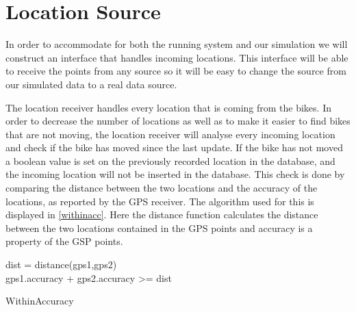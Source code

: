 \section{Location Source}\label{design:datareceiver}
In order to accommodate for both the running system and our simulation we will construct an interface that handles incoming locations.
This interface will be able to receive the points from any source so it will be easy to change the source from our simulated data to a real data source.

The location receiver handles every location that is coming from the bikes.
In order to decrease the number of locations as well as to make it easier to find bikes that are not moving, the location receiver will analyse every incoming location and check if the bike has moved since the last update.
If the bike has not moved a boolean value is set on the previously recorded location in the database, and the incoming location will not be inserted in the database.
This check is done by comparing the distance between the two locations and the accuracy of the locations, as reported by the GPS receiver.
The algorithm used for this is displayed in \cref{withinacc}.
Here the distance function calculates the distance between the two locations contained in the GPS points and accuracy is a property of the GSP points.

\begin{algorithm}

dist = distance(gps1,gps2)\\
\Return gps1.accuracy + gps2.accuracy >= dist

\caption{WithinAccuracy}
\label{withinacc}
\end{algorithm}

